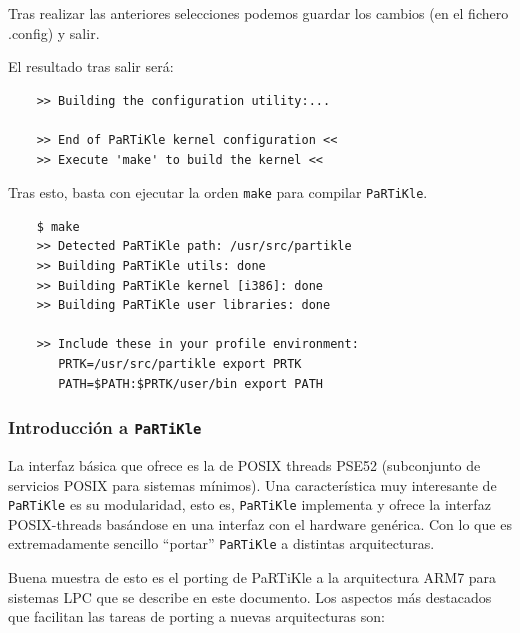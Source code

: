 \documentclass[10pt,a4paper]{article}
\newcommand{\partikle}[0]{\texttt{PaRTiKle}}
\begin{document}
	Tras realizar las anteriores selecciones podemos guardar los cambios (en el fichero .config) y salir.

	El resultado tras salir será:

	\begin{verbatim}
	>> Building the configuration utility:...

	>> End of PaRTiKle kernel configuration <<
	>> Execute 'make' to build the kernel <<
	\end{verbatim}

	Tras esto, basta con ejecutar la orden \texttt{make} para compilar \partikle{}.

	\begin{verbatim}
	$ make
	>> Detected PaRTiKle path: /usr/src/partikle
	>> Building PaRTiKle utils: done                 
	>> Building PaRTiKle kernel [i386]: done                                    
	>> Building PaRTiKle user libraries: done                  
	
	>> Include these in your profile environment:
	   PRTK=/usr/src/partikle export PRTK
	   PATH=$PATH:$PRTK/user/bin export PATH
	\end{verbatim}
	
	\subsubsection{Introducción a \partikle{}}
	
	La interfaz básica que ofrece es la de POSIX threads PSE52 (subconjunto de servicios POSIX para sistemas mínimos).  Una característica muy interesante de \partikle{} es su modularidad, esto es, \partikle{} implementa y ofrece la interfaz POSIX-threads basándose en una interfaz con el hardware genérica. Con lo que es extremadamente sencillo ``portar'' \partikle{} a distintas arquitecturas.
	
	Buena muestra de esto es el porting de PaRTiKle a la arquitectura ARM7 para sistemas LPC que se describe en este documento. Los aspectos más destacados que facilitan las tareas de porting a nuevas arquitecturas son:
	
\end{document}
